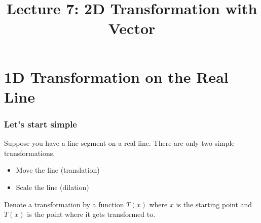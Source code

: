 \title{Lecture 7: 2D Transformation with Vector}
\frame{\titlepage}

\section[1D on line]{1D Transformation on the Real Line}
\frame{\sectionpage}

\begin{frame}
\frametitle{Let's start simple}
Suppose you have a line segment on a real line. There are only two simple transformations.
\begin{itemize}
\item Move the line (translation)
\item Scale the line (dilation)
\end{itemize}
Denote a transformation by a function $T(x)$ where $x$ is the starting point and $T(x)$ is the point where it gets transformed to.
\end{frame}

